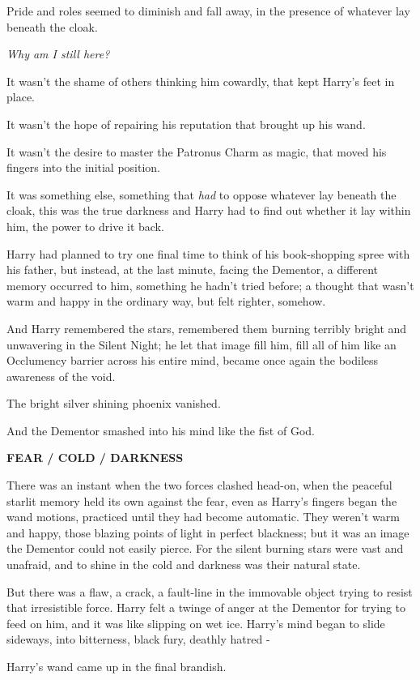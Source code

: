 Pride and roles seemed to diminish and fall away, in the presence of whatever lay beneath the cloak.

\emph{Why am I still here?}

It wasn't the shame of others thinking him cowardly, that kept Harry's feet in place.

It wasn't the hope of repairing his reputation that brought up his wand.

It wasn't the desire to master the Patronus Charm as magic, that moved his fingers into the initial position.

It was something else, something that \emph{had} to oppose whatever lay beneath the cloak, this was the true darkness and Harry had to find out whether it lay within him, the power to drive it back.

Harry had planned to try one final time to think of his book-shopping spree with his father, but instead, at the last minute, facing the Dementor, a different memory occurred to him, something he hadn't tried before; a thought that wasn't warm and happy in the ordinary way, but felt righter, somehow.

And Harry remembered the stars, remembered them burning terribly bright and unwavering in the Silent Night; he let that image fill him, fill all of him like an Occlumency barrier across his entire mind, became once again the bodiless awareness of the void.

The bright silver shining phoenix vanished.

And the Dementor smashed into his mind like the fist of God.

\textbf{FEAR / COLD / DARKNESS}

There was an instant when the two forces clashed head-on, when the peaceful starlit memory held its own against the fear, even as Harry's fingers began the wand motions, practiced until they had become automatic. They weren't warm and happy, those blazing points of light in perfect blackness; but it was an image the Dementor could not easily pierce. For the silent burning stars were vast and unafraid, and to shine in the cold and darkness was their natural state.

But there was a flaw, a crack, a fault-line in the immovable object trying to resist that irresistible force. Harry felt a twinge of anger at the Dementor for trying to feed on him, and it was like slipping on wet ice. Harry's mind began to slide sideways, into bitterness, black fury, deathly hatred -

Harry's wand came up in the final brandish.

